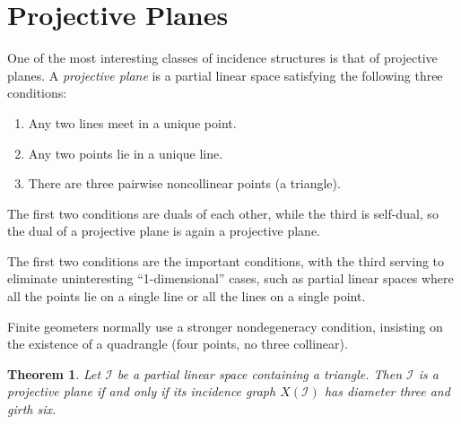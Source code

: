 \documentclass[12pt,a4paper,openany]{book}
\newtheorem{theorem}{Theorem}[section]
\begin{document}
\section{Projective Planes}
One of the most interesting classes of incidence structures is that of projective planes. A \emph{projective plane} is a partial linear space satisfying the following three conditions:
\begin{enumerate}
    \item Any two lines meet in a unique point.
    \item Any two points lie in a unique line.
    \item There are three pairwise noncollinear points (a triangle).
\end{enumerate}
The first two conditions are duals of each other, while the third is self-dual, so the dual of a projective plane is again a projective plane.

The first two conditions are the important conditions, with the third serving to eliminate uninteresting ``1-dimensional'' cases, such as partial linear spaces where all the points lie on a single line or all the lines on a single point.

Finite geometers normally use a stronger nondegeneracy condition, insisting on the existence of a quadrangle (four points, no three collinear). 

\begin{theorem}\label{thm:projective-plane-graph}
Let $\mathcal{I}$ be a partial linear space containing a triangle. Then $\mathcal{I}$ is a projective plane if and only if its incidence graph $X(\mathcal{I})$ has diameter three and girth six.
\end{theorem}
\end{document}
